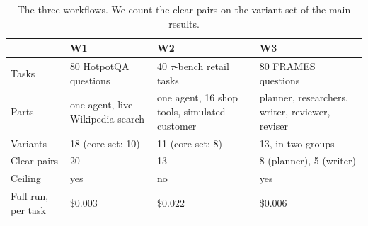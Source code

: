\begin{table}[t]
\centering\scriptsize
\renewcommand{\arraystretch}{1.08}\setlength{\tabcolsep}{4pt}
\begin{tabular}{@{}p{12mm}p{17mm}p{18.5mm}p{19.5mm}@{}}
\toprule
& \textbf{W1} & \textbf{W2} & \textbf{W3} \\
\midrule
Tasks & 80 HotpotQA questions & 40 $\tau$-bench retail tasks & 80 FRAMES questions \\
Parts & one agent, live Wikipedia search & one agent, 16 shop tools, simulated customer &
planner, researchers, writer, reviewer, reviser \\
Variants & 18 (core set: 10) & 11 (core set: 8) & 13, in two groups \\
Clear pairs & 20 & 13 & 8 (planner), 5 (writer) \\
Ceiling & yes & no & yes \\
Full run, per task & \$0.003 & \$0.022 & \$0.006 \\
\bottomrule
\end{tabular}
\caption{The three workflows. We count the clear pairs on the variant set of the main results.}
\label{tab:workflows}
\end{table}
